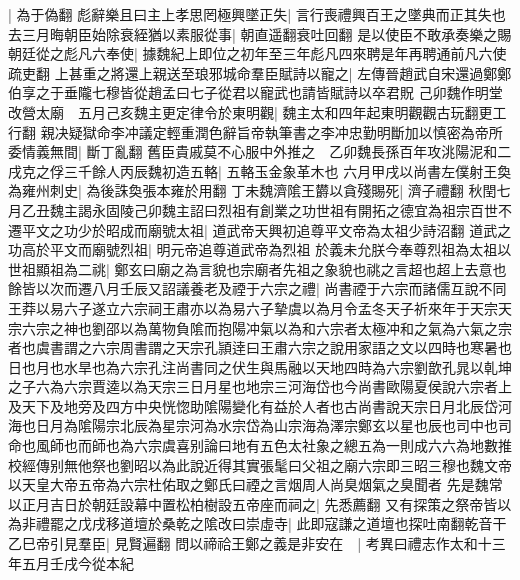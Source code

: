 |{
	為于偽翻}
彪辭樂且曰主上孝思罔極興墜正失|{
	言行喪禮興百王之墜典而正其失也}
去三月晦朝臣始除衰絰猶以素服從事|{
	朝直遥翻衰吐回翻}
是以使臣不敢承奏樂之賜朝廷從之彪凡六奉使|{
	據魏紀上即位之初年至三年彪凡四來聘是年再聘通前凡六使疏吏翻}
上甚重之將還上親送至琅邪城命羣臣賦詩以寵之|{
	左傳晉趙武自宋還過鄭鄭伯享之于垂隴七穆皆從趙孟曰七子從君以寵武也請皆賦詩以卒君貺}
己卯魏作明堂改營太廟　五月己亥魏主更定律令於東明觀|{
	魏主太和四年起東明觀觀古玩翻更工行翻}
親决疑獄命李冲議定輕重潤色辭旨帝執筆書之李冲忠勤明斷加以慎密為帝所委情義無間|{
	斷丁亂翻}
舊臣貴戚莫不心服中外推之　乙卯魏長孫百年攻洮陽泥和二戌克之俘三千餘人丙辰魏初造五輅|{
	五輅玉金象革木也}
六月甲戌以尚書左僕射王奐為雍州刺史|{
	為後誅奐張本雍於用翻}
丁未魏濟隂王欝以貪殘賜死|{
	濟子禮翻}
秋閏七月乙丑魏主謁永固陵己卯魏主詔曰烈祖有創業之功世祖有開拓之德宜為祖宗百世不遷平文之功少於昭成而廟號太祖|{
	道武帝天興初追尊平文帝為太祖少詩沼翻}
道武之功高於平文而廟號烈祖|{
	明元帝追尊道武帝為烈祖}
於義未允朕今奉尊烈祖為太祖以世祖顯祖為二祧|{
	鄭玄曰廟之為言貌也宗廟者先祖之象貌也祧之言超也超上去意也}
餘皆以次而遷八月壬辰又詔議養老及禋于六宗之禮|{
	尚書禋于六宗而諸儒互說不同王莽以易六子遂立六宗祠王肅亦以為易六子摯虞以為月令孟冬天子祈來年于天宗天宗六宗之神也劉邵以為萬物負隂而抱陽冲氣以為和六宗者太極冲和之氣為六氣之宗者也虞書謂之六宗周書謂之天宗孔頴逹曰王肅六宗之說用家語之文以四時也寒暑也日也月也水旱也為六宗孔注尚書同之伏生與馬融以天地四時為六宗劉歆孔晁以乹坤之子六為六宗賈逵以為天宗三日月星也地宗三河海岱也今尚書歐陽夏侯說六宗者上及天下及地旁及四方中央恍惚助隂陽變化有益於人者也古尚書說天宗日月北辰岱河海也日月為隂陽宗北辰為星宗河為水宗岱為山宗海為澤宗鄭玄以星也辰也司中也司命也風師也而師也為六宗虞喜别論曰地有五色太社象之總五為一則成六六為地數推校經傳别無他祭也劉昭以為此說近得其實張髦曰父祖之廟六宗即三昭三穆也魏文帝以天皇大帝五帝為六宗杜佑取之鄭氏曰禋之言烟周人尚臭烟氣之臭聞者}
先是魏常以正月吉日於朝廷設幕中置松柏樹設五帝座而祠之|{
	先悉薦翻}
又有探策之祭帝皆以為非禮罷之戊戌移道壇於桑乾之隂改曰崇虛寺|{
	此即寇謙之道壇也探吐南翻乾音干}
乙巳帝引見羣臣|{
	見賢遍翻}
問以禘祫王鄭之義是非安在　|{
	考異曰禮志作太和十三年五月壬戌今從本紀}
